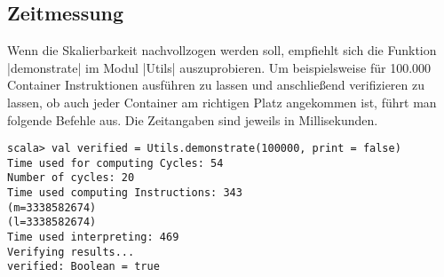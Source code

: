 \subsection{Zeitmessung}
Wenn die Skalierbarkeit nachvollzogen werden soll,
empfiehlt sich die Funktion |demonstrate| im Modul |Utils| auszuprobieren.
Um beispielsweise für 100.000 Container Instruktionen ausführen zu lassen und anschließend verifizieren zu lassen,
ob auch jeder Container am richtigen Platz angekommen ist, führt man folgende Befehle aus.
Die Zeitangaben sind jeweils in Millisekunden.
\begin{lstlisting}
scala> val verified = Utils.demonstrate(100000, print = false)
Time used for computing Cycles: 54
Number of cycles: 20
Time used computing Instructions: 343
(m=3338582674)
(l=3338582674)
Time used interpreting: 469
Verifying results...
verified: Boolean = true
\end{lstlisting}

\lstset{xleftmargin=-.8cm,xrightmargin=-.8cm}
\fontsize{8pt}{8.4pt}
\lstset{basicstyle=\ttfamily\small}
\clearpage
